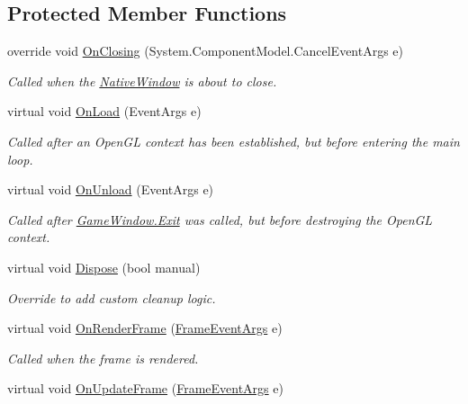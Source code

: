 \subsection*{Protected Member Functions}
\begin{DoxyCompactItemize}
\item 
override void \hyperlink{class_open_t_k_1_1_game_window_ac2bfae65b7874a59517461c72ce66663}{On\-Closing} (System.\-Component\-Model.\-Cancel\-Event\-Args e)
\begin{DoxyCompactList}\small\item\em Called when the \hyperlink{class_open_t_k_1_1_native_window}{Native\-Window} is about to close. \end{DoxyCompactList}\item 
virtual void \hyperlink{class_open_t_k_1_1_game_window_ae4e7becd70baac5336bdc9b67f11bfec}{On\-Load} (Event\-Args e)
\begin{DoxyCompactList}\small\item\em Called after an Open\-G\-L context has been established, but before entering the main loop. \end{DoxyCompactList}\item 
virtual void \hyperlink{class_open_t_k_1_1_game_window_ad993aec512d39466135f8db9185d3588}{On\-Unload} (Event\-Args e)
\begin{DoxyCompactList}\small\item\em Called after \hyperlink{class_open_t_k_1_1_game_window_a67c26214c431300b56b0f4a88bbbd244}{Game\-Window.\-Exit} was called, but before destroying the Open\-G\-L context. \end{DoxyCompactList}\item 
virtual void \hyperlink{class_open_t_k_1_1_game_window_a7dd618cf51ddede98772041ddaa729db}{Dispose} (bool manual)
\begin{DoxyCompactList}\small\item\em Override to add custom cleanup logic. \end{DoxyCompactList}\item 
virtual void \hyperlink{class_open_t_k_1_1_game_window_abc3e3a8c21a36d226c9d899f094152a4}{On\-Render\-Frame} (\hyperlink{class_open_t_k_1_1_frame_event_args}{Frame\-Event\-Args} e)
\begin{DoxyCompactList}\small\item\em Called when the frame is rendered. \end{DoxyCompactList}\item 
virtual void \hyperlink{class_open_t_k_1_1_game_window_a081795ead94557090f58e83d471b0d05}{On\-Update\-Frame} (\hyperlink{class_open_t_k_1_1_frame_event_args}{Frame\-Event\-Args} e)

\end{DoxyCompactItemize}
